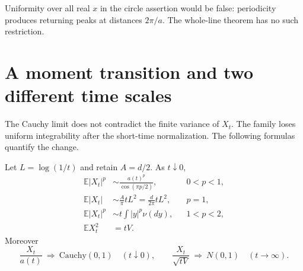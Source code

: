 Uniformity over all real $x$ in the circle assertion would be false:
periodicity produces returning peaks at distances $2\pi/a$. The
whole-line theorem has no such restriction.

\section{A moment transition and two different time scales}

The Cauchy limit does not contradict the finite variance of $X_t$.
The family loses uniform integrability after the short-time
normalization. The following formulas quantify the change.

\begin{theorem}\label{thm:moment-transition}
Let $L=\log(1/t)$ and retain $A=d/2$. As $t\downarrow0$,
\begin{align*}
 \mathbb E|X_t|^p
 &\sim \frac{a(t)^p}{\cos(\pi p/2)},&&0<p<1,\\
 \mathbb E|X_t|
 &\sim \frac A\pi tL^2
       =\frac d{2\pi}tL^2,&&p=1,\\
 \mathbb E|X_t|^p
 &\sim t\int |y|^p\nu(dy),&&1<p<2,\\
 \mathbb E X_t^2&=tV.&&
\end{align*}
Moreover
\[
 \frac{X_t}{a(t)}\ \Longrightarrow\ \mathrm{Cauchy}(0,1)
 \quad(t\downarrow0),\qquad
 \frac{X_t}{\sqrt{tV}}\ \Longrightarrow\ N(0,1)
 \quad(t\longrightarrow\infty).
\]
\end{theorem}

